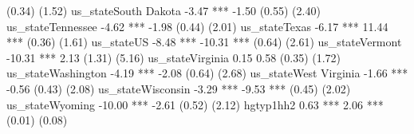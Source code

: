                                                                (0.34)        (1.52)                                 
us_stateSouth Dakota                                           -3.47 ***     -1.50                                  
                                                               (0.55)        (2.40)                                 
us_stateTennessee                                              -4.62 ***     -1.98                                  
                                                               (0.44)        (2.01)                                 
us_stateTexas                                                  -6.17 ***     11.44 ***                              
                                                               (0.36)        (1.61)                                 
us_stateUS                                                     -8.48 ***    -10.31 ***                              
                                                               (0.64)        (2.61)                                 
us_stateVermont                                               -10.31 ***      2.13                                  
                                                               (1.31)        (5.16)                                 
us_stateVirginia                                                0.15          0.58                                  
                                                               (0.35)        (1.72)                                 
us_stateWashington                                             -4.19 ***     -2.08                                  
                                                               (0.64)        (2.68)                                 
us_stateWest Virginia                                          -1.66 ***     -0.56                                  
                                                               (0.43)        (2.08)                                 
us_stateWisconsin                                              -3.29 ***     -9.53 ***                              
                                                               (0.45)        (2.02)                                 
us_stateWyoming                                               -10.00 ***     -2.61                                  
                                                               (0.52)        (2.12)                                 
hgtyp1hh2                                                                                    0.63 ***       2.06 ***
                                                                                            (0.01)         (0.08)   
